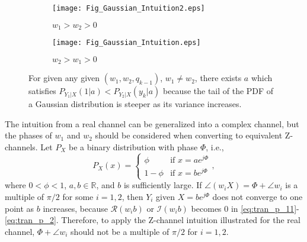 \documentclass[journal]{IEEEtran}
\begin{document}
\begin{figure}
    \centering
    
    \begin{subfigure}[b]{\columnwidth}
    \centering
    \texttt{[image: Fig\_Gaussian\_Intuition2.eps]}
    \caption{$w_1 > w_2 > 0$  \\ \vspace{10pt}}
    \end{subfigure}
    
    \begin{subfigure}[b]{\columnwidth}
    \centering
    \texttt{[image: Fig\_Gaussian\_Intuition.eps]}
    \caption{$w_2>w_1>0$}
    \end{subfigure}

    \caption{For given any given $(w_1,w_2,q_{k-1})$, $w_1\neq w_2$, there exists $a$ which satisfies $P_{Y_1|X}(1|a) < P_{Y_2|X}(y_k|a)$ because the tail of the PDF of a Gaussian distribution is steeper as its variance increases.}
    \label{fig:Gaussian_Intuition}
\end{figure}


The intuition from a real channel can be generalized into a complex channel, but the phases of $w_1$ and $w_2$ should be considered when converting to equivalent Z-channels. Let $P_X$ be a binary distribution with phase $\Phi$, i.e., 
\begin{equation}
    P_X(x) = \begin{cases} \phi & \text{if } x=ae^{j\Phi} \\ 1-\phi & \text{if } x=be^{j\Phi}\end{cases},
\end{equation}
where $0<\phi<1$, $a,b \in \mathbb{R}$, and $b$ is sufficiently large.
If $\angle (w_i X) = \Phi+\angle w_i$ is a multiple of $\pi/2$ for some $i=1,2$, then $Y_i$ given $X=be^{j\Phi}$ does not converge to one point as $b$ increases, because $\mathcal{R}(w_ib)$ or $\mathcal{I}(w_ib)$ becomes 0 in \eqref{eq:tran_p_11}-\eqref{eq:tran_p_2}. Therefore, to apply the Z-channel intuition illustrated for the real channel, $\Phi+ \angle w_i$ should not be a multiple of $\pi/2$ for $i=1,2$.
\end{document}
